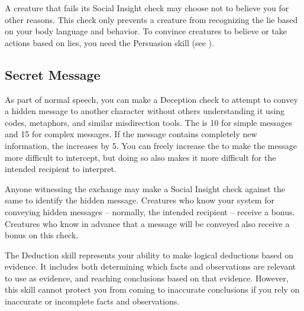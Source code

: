         A creature that fails its Social Insight check may choose not to believe you for other reasons.
        This check only prevents a creature from recognizing the lie based on your body language and behavior.
        To convince creatures to believe or take actions based on lies, you need the Persuasion skill (see ).

    \subsection{Secret Message}
        As part of normal speech, you can make a Deception check to attempt to convey a hidden message to another character without others understanding it using codes, metaphors, and similar misdirection tools. The  is 10 for simple messages and 15 for complex messages. If the message contains completely new information, the  increases by 5. You can freely increase the  to make the message more difficult to intercept, but doing so also makes it more difficult for the intended recipient to interpret.

        Anyone witnessing the exchange may make a Social Insight check against the same  to identify the hidden message.
        Creatures who know your system for conveying hidden messages -- normally, the intended recipient -- receive a  bonus.
        Creatures who know in advance that a message will be conveyed also receive a  bonus on this check.


\newpage
{}
    The Deduction skill represents your ability to make logical deductions based on evidence.
    It includes both determining which facts and observations are relevant to use as evidence, and reaching conclusions based on that evidence.
    However, this skill cannot protect you from coming to inaccurate conclusions if you rely on inaccurate or incomplete facts and observations.


